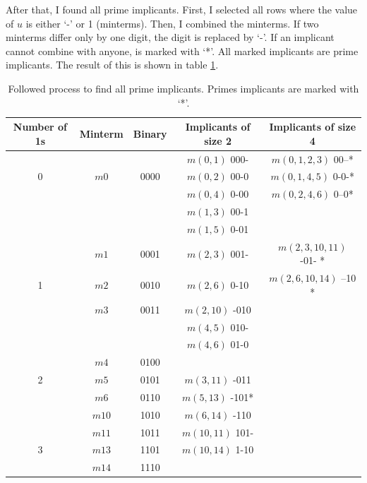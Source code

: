 \documentclass[a4paper, 10pt]{article}
\begin{document}
After that, I found all prime implicants. First, I selected all rows where the value of $u$ is either `-' or 1 (minterms). Then, I combined the minterms. If two minterms differ only by one digit, the digit is replaced by `-'. If an implicant cannot combine with anyone, is marked with `*'. All marked implicants are prime implicants. The result of this is shown in table \ref{tab:minterms}.
\begin{table}[hbtp]
    \centering
    \begin{tabular}{|c c c | c | c |}
        \hline
        Number of 1s    & Minterm   & Binary    & Implicants of size 2 & Implicants of size 4\\ \hline
                        &           &           & $m(0,1)$   000- & $m(0,1,2,3)$ 00--*\\
        0               & $m0$   & 0000      & $m(0,2)$   00-0 & $m(0,1,4,5)$ 0-0-*\\
                        &           &           & $m(0,4)$   0-00 & $m(0,2,4,6)$ 0--0*\\ \hline
                        &           &           & $m(1,3)$   00-1 &  \\ 
                        &           &           & $m(1,5)$   0-01 &  \\ 
                        & $m1$   & 0001      & $m(2,3)$   001- & $m(2,3,10,11)$ -01- *  \\
        1               & $m2$   & 0010      & $m(2,6)$   0-10 & $m(2,6,10,14)$ --10 * \\
                        & $m3$   & 0011      & $m(2,10)$  -010 & \\
                        &           &           & $m(4,5)$   010- & \\
                        &           &           & $m(4,6)$   01-0 & \\ \hline     
                        & $m4$   & 0100      &                 &    \\
        2               & $m5$   & 0101      & $m(3,11)$  -011 &   \\
                        & $m6$   & 0110      & $m(5,13)$  -101*&  \\
                        & $m10$  & 1010      & $m(6,14)$  -110 &  \\ \cline{1-3}
                        & $m11$  & 1011      & $m(10,11)$ 101- &  \\
        3               & $m13$  & 1101      & $m(10,14)$ 1-10 &  \\ 
                        & $m14$  & 1110      & & \\ \hline
    \end{tabular}
    \caption{Followed process to find all prime implicants. Primes implicants are marked with `*'.}
    \label{tab:minterms}
\end{table}
\end{document}
